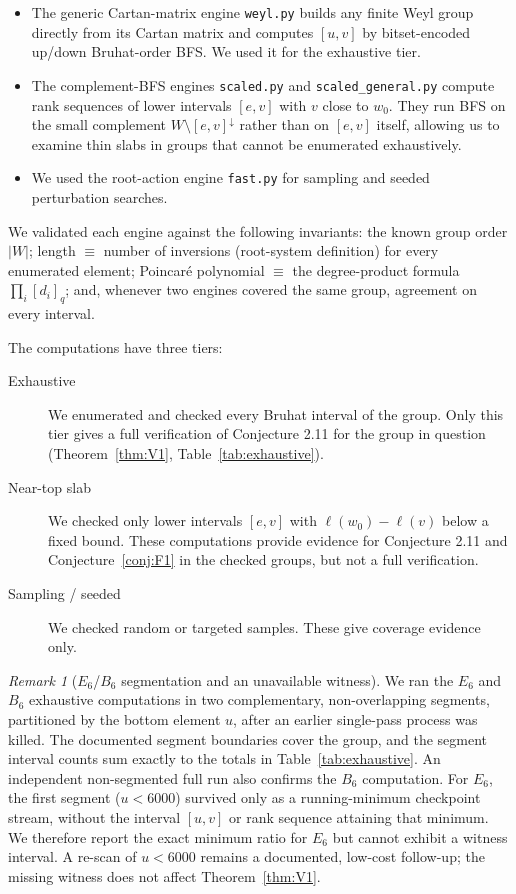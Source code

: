 \documentclass[11pt]{amsart}
\theoremstyle{plain}
\theoremstyle{definition}
\theoremstyle{remark}
\newtheorem{remark}[theorem]{Remark}
\newcommand{\W}{W}
\begin{document}
\begin{itemize}
\item The generic Cartan-matrix engine \texttt{weyl.py} builds any finite
Weyl group directly from its Cartan matrix and computes $[u,v]$ by
bitset-encoded up/down Bruhat-order BFS. We used it for the exhaustive
tier.
\item The complement-BFS engines \texttt{scaled.py} and
\texttt{scaled\_general.py} compute rank sequences of lower intervals
$[e,v]$ with $v$ close to $w_0$. They run BFS on the small complement
$\W\setminus [e,v]^{\downarrow}$ rather than on $[e,v]$ itself, allowing us
to examine thin slabs in groups that cannot be enumerated exhaustively.
\item We used the root-action engine \texttt{fast.py} for sampling and
seeded perturbation searches.
\end{itemize}

We validated each engine against the following invariants: the known group
order $|\W|$; length $\equiv$ number of inversions (root-system definition)
for every enumerated element; Poincar\'e polynomial $\equiv$ the
degree-product formula $\prod_i[d_i]_q$; and, whenever two engines covered
the same group, agreement on every interval.

The computations have three tiers:

\begin{description}
\item[Exhaustive] We enumerated and checked every Bruhat interval of the
group. Only this tier gives a full verification of Conjecture 2.11 for the
group in question (Theorem~\ref{thm:V1},
Table~\ref{tab:exhaustive}).
\item[Near-top slab] We checked only lower intervals $[e,v]$ with
$\ell(w_0)-\ell(v)$ below a fixed bound. These computations provide
evidence for Conjecture 2.11 and Conjecture~\ref{conj:F1} in the checked
groups, but not a full verification.
\item[Sampling / seeded] We checked random or targeted samples. These give
coverage evidence only.
\end{description}

\begin{remark}[$E_6$/$B_6$ segmentation and an unavailable witness]
\label{rem:e6segment}
We ran the $E_6$ and $B_6$ exhaustive computations in two complementary,
non-overlapping segments, partitioned by the bottom element $u$, after an
earlier single-pass process was killed. The documented segment boundaries
cover the group, and the segment interval counts sum exactly to the totals
in Table~\ref{tab:exhaustive}. An independent non-segmented full run also
confirms the $B_6$ computation. For $E_6$, the first segment ($u<6000$)
survived only as a running-minimum checkpoint stream, without the interval
$[u,v]$ or rank sequence attaining that minimum. We therefore report the
exact minimum ratio for $E_6$ but cannot exhibit a witness interval. A
re-scan of $u<6000$ remains a documented, low-cost follow-up; the missing
witness does not affect Theorem~\ref{thm:V1}.
\end{remark}
\end{document}

